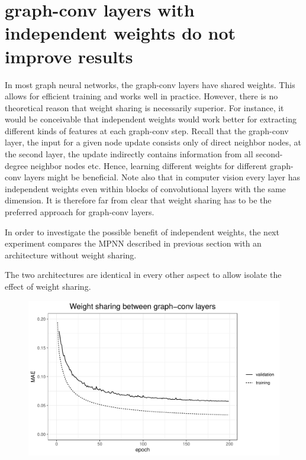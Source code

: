 

\section{graph-conv layers with independent weights do not improve results}

%	
%
%

In most graph neural networks, the graph-conv layers have shared weights. This allows for efficient training and works well in practice. However, there is no theoretical reason that weight sharing is necessarily superior. For instance, it would be conceivable that independent weights would work better for extracting different kinds of features at each graph-conv step. Recall that the graph-conv layer, the input for a given node update consists only of direct neighbor nodes, at the second layer, the update indirectly contains information from all second-degree neighbor nodes etc. Hence, learning different weights for different graph-conv layers might be beneficial. Note also that in computer vision every layer has independent weights even within blocks of convolutional layers with the same dimension. It is therefore far from clear that weight sharing has to be the preferred approach for graph-conv layers.

In order to investigate the possible benefit of independent weights, the next experiment compares the MPNN described in previous section with an architecture without weight sharing. 

The two architectures are identical in every other aspect to allow isolate the effect of weight sharing. 

\begin{figure}[H]
	\includegraphics[width=\linewidth]{figures/weight-sharing}
	
	\caption{}
	\label{fig:weight-sharing}
\end{figure}

